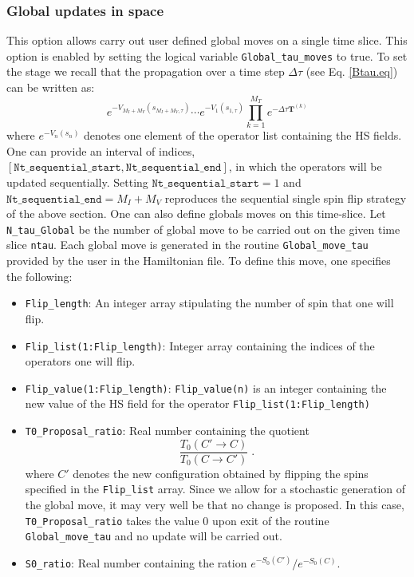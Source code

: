 \subsubsection{Global updates in space}
\label{Global_space.sec}
This option allows  carry out  user defined global moves on a single time slice.  This option is enabled by setting the logical variable  \texttt{Global\_tau\_moves}   to true.  To set the stage  we recall that the propagation over a time step $\Delta \tau$   (see Eq. \ref{Btau.eq}) can be  written as: 
\begin{equation}
	e^{-V_{M_I+M_V}(s_{M_I+M_V,\tau})}  \cdots e^{-V_{1}(s_{1,\tau})}  \prod_{k=1}^{M_T}   e^{-\Delta \tau {\bm T}^{(k)}}  
\end{equation}
where $e^{-V_{n}(s_{n})}$ denotes one element of the  operator list  containing the HS fields.  One can provide  an interval of indices, 
$ \left[ \texttt{Nt\_sequential\_start}, 
\texttt{Nt\_sequential\_end} \right] $,  in which the operators will be updated  sequentially. Setting $ \texttt{Nt\_sequential\_start} =1 $ and 
$ \texttt{Nt\_sequential\_end} = M_I+M_V$  reproduces the  sequential single spin flip strategy of the above section.   One can also define globals moves on this time-slice.  Let  \texttt{N\_tau\_Global}  be the number of global move to be carried out on the given time slice \texttt{ntau}.  Each global move is generated in the routine  \texttt{Global\_move\_tau} provided by the user in the Hamiltonian file.    To  define this move, one specifies the following: 
\begin{itemize}
\item \texttt{Flip\_length}:  An integer  array  stipulating the  number of spin that one  will flip.
\item \texttt{Flip\_list(1:Flip\_length)}:   Integer array containing the  indices of the operators  one will flip.
\item \texttt{Flip\_value(1:Flip\_length)}:  \texttt{Flip\_value(n)} is an  integer containing the new value of the  HS  field for the operator 
\texttt{Flip\_list(1:Flip\_length)}
\item  \texttt{T0\_Proposal\_ratio}:   Real number containing  the quotient
\begin{equation}
	 \frac{T_0(C' \rightarrow C)}{T_0(C \rightarrow C') }  \;.
\end{equation}
where $ C'$  denotes the new configuration  obtained by flipping the spins specified in the \texttt{Flip\_list}  array. 
Since we allow for a stochastic  generation of  the global move, it may very well be that no change is proposed. In this case, \texttt{T0\_Proposal\_ratio}   takes the value 0 upon exit of the routine \texttt{Global\_move\_tau} and  no update will be carried out. 
\item \texttt{S0\_ratio}:   Real number containing  the ration  $e^{-S_0(C')}/e^{-S_0(C)}$. 
\end{itemize}
